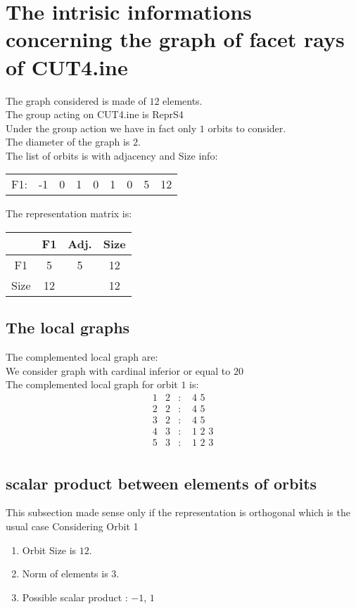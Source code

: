 \documentclass[12pt]{article}
\begin{document}
\section{The intrisic informations concerning the graph of facet rays of CUT4.ine}
The graph considered is made of $12$ elements.\\
The group acting on CUT4.ine is ReprS4\\
Under the group action we have in fact only $1$ orbits to consider.\\
The diameter of the graph is $2$.\\
The list of orbits is with adjacency and Size info:
\begin{center}
\scriptsize
\begin{tabular}{ccccccc|c|c}
F1:&-1&0&1&0&1&0&5&12\\
\end{tabular}
\end{center}
The representation matrix is:
\begin{center}
\scriptsize
\begin{tabular}{|c|c|c|c|}
\hline
&F1&Adj.&Size\\
\hline
F1& 5&5&12\\
\hline
Size&12&&12\\
\hline
\end{tabular}
\end{center}
\subsection{The local graphs}
The complemented local graph are:\\
We consider graph with cardinal inferior or equal to $20$\\
The complemented local graph for orbit $1$ is:
\begin{equation*}
\begin{array}{rrcl}
1&2&:&\,\,4\,\,5\\
2&2&:&\,\,4\,\,5\\
3&2&:&\,\,4\,\,5\\
4&3&:&\,\,1\,\,2\,\,3\\
5&3&:&\,\,1\,\,2\,\,3\\
\end{array}
\end{equation*}
\subsection{scalar product between elements of orbits}
\noindent This subsection made sense only if the representation is orthogonal which is the usual case
Considering Orbit 1
\begin{enumerate}
\item Orbit Size is $12$.
\item Norm of elements is $3$.
\item Possible scalar product : $-1$, $1$
\end{enumerate}
\end{document}
